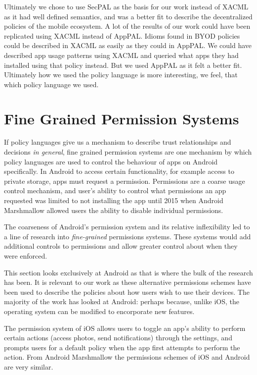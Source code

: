 \documentclass[thesis.tex]{subfiles}
\begin{document}
Ultimately we chose to use SecPAL as the basis for our work instead of XACML as
it had well defined semantics, and was a better fit to describe the
decentralized policies of the mobile ecosystem. A lot of the results of our work
could have been replicated using XACML instead of AppPAL. Idioms found in BYOD
policies could be described in XACML as easily as they could in AppPAL. We could
have described app usage patterns using XACML and queried what apps they had
installed using that policy instead. But we used AppPAL as it felt a better fit.
Ultimately how we used the policy language is more interesting, we feel, that
which policy language we used.

\section{Fine Grained Permission Systems}
\label{sec:fine-grained-permissions}

If policy languages give us a mechanism to describe trust relationships and
decisions \emph{in general}, fine grained permission systems are one mechanism
by which policy languages are used to control the behaviour of apps on Android
specifically. In Android to access certain functionality, for example access to
private storage, apps must request a permission. Permissions are a coarse usage
control mechanism, and user's ability to control what permissions an app
requested was limited to not installing the app until 2015 when Android
Marshmallow allowed users the ability to disable individual permissions.

The coarseness of Android's permission system and its
relative inflexibility led to a line of research into
\emph{fine-grained} permissions systems.  These systems would add
additional controls to permissions and allow greater control about
when they were enforced.

This section looks exclusively at Android as that is where the bulk of the
research has been. It is relevant to our work as these alternative permissions
schemes have been used to describe the policies about how users wish to use
their devices. The majority of the work has looked at Android: perhaps because,
unlike iOS, the operating system can be modified to encorporate new features.

The permission system of iOS allows users to
toggle an app's ability to perform certain actions (access photos,
send notifications) through the settings, and prompts users for a
default policy when the app first attempts to perform the action.
From Android Marshmallow the permissions schemes of iOS and Android
are very similar.
\end{document}

